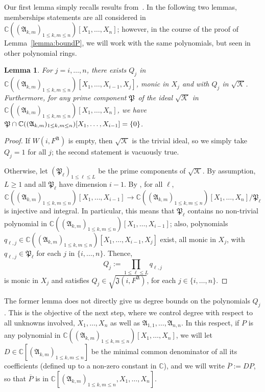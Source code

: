 \documentclass[12pt]{article}
\def\frkJ{\mathfrak{J}}
\def\fp{\mathfrak{P}}
\def\A{\mathfrak{A}}
\def\C{\mathbb{C}}
\newtheorem{lemma}[theorem]{Lemma}
\begin{document}
Our first lemma simply recalls results from~\cite{EMP}.  In the
following two lemmas, memberships statements are all considered in
$\C((\A_{k,m})_{1 \le k,m \le n})[X_1,\dots,X_n]$; however, in the
course of the proof of Lemma~\ref{lemma:boundP}, we will work with the
same polynomials, but seen in other polynomial rings.
\begin{lemma}\label{lem:6.1}
  For $j=i,\dots,n$, there exists $Q_j$ in $\C((\A_{k,m})_{1 \le k,m
    \le n})[X_1,\dots,X_{i-1},X_j]$, monic in $X_j$ and with $Q_{j}$
  in $\sqrt{\mathscr{K}}$. Furthermore, for any prime component $\frak
  P$ of the ideal $\sqrt{\mathscr{K}}$ in $\C((\A_{k,m})_{1 \le k,m \le
    n})[X_1,\dots,X_n]$, we have $\frak P \cap \C((\A_{k,m})_{1 \le
    k,m \le n})[X_1,\dots,X_{i-1}] = \{0\}$.
\end{lemma}
\begin{proof}
  If $W(i,F^\A)$ is empty, then $\sqrt{\mathscr{K}}$ is the trivial
  ideal, so we simply take $Q_j=1$ for all $j$; the second statement
  is vacuously true.

  Otherwise, let $(\fp_\ell)_{1 \le \ell \leq L}$ be the prime
  components of $\sqrt{\mathscr{K}}$.  By assumption, $L \ge 1$
  and all $\fp_\ell$ have dimension $i-1$. By \cite[Proposition
    1]{EMP}, for all $\ell$,
  \[
    \C((\A_{k,m})_{1 \le k,m \le n})[X_1,\dots,X_{i-1}]\rightarrow\C((\A_{k,m})_{1 \le k,m \le n})[X_1,\dots,X_n]/\fp_\ell
  \] 
  is injective and integral. In particular, this means that $\fp_\ell$
  contains no non-trivial polynomial in $\C((\A_{k,m})_{1 \le k,m \le
    n})[X_1,\dots,X_{i-1}]$; also, polynomials
  $q_{\ell,j}\in\C((\A_{k,m})_{1 \le k,m \le
    n})[X_1,\dots,X_{i-1},X_j]$ exist, all monic in $X_j$, with
  $q_{\ell,j}\in \fp_\ell$ for each $j$ in $\{i,\hdots,n\}.$
  Thence, \[Q_{j} := \prod_{1 \le \ell\le L} q_{\ell,j}\] is monic in
  $X_j$ and satisfies $ Q_{j} \in \sqrt{\frkJ(i,F^\A)}$, for each $j
  \in \{i,\hdots,n\}.$
\end{proof}
The former lemma does not directly give us degree bounds on the
polynomials $Q_j$. This is the objective of the next step, where we
control degree with respect to all unknowns involved, $X_1,\dots,X_n$
as well as $\A_{1,1},\dots,\A_{n,n}$.  In this respect, if $P$ is any
polynomial in $\C((\A_{k,m})_{1 \le k,m \le n})[X_1,\dots,X_n]$, we
will let $D \in \C[(\A_{k,m})_{1 \le k,m \le n}]$ be the minimal
common denominator of all its coefficients (defined up to a non-zero
constant in $\C$), and we will write $\overline P := D P$, so that
$\overline P$ is in $\C[(\A_{k,m})_{1 \le k,m \le n},X_1,\dots,X_n]$.
\end{document}
